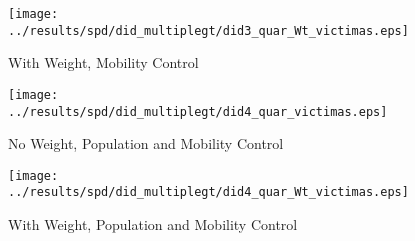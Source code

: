 \documentclass[11pt,letterpaper]{article}
\begin{document}
\begin{figure}[H]
\caption{With Weight, Mobility Control}
\centering
\texttt{[image: ../results/spd/did\_multiplegt/did3\_quar\_Wt\_victimas.eps]}
\end{figure}
\begin{figure}[H]
\caption{No Weight, Population and Mobility Control}
\centering
\texttt{[image: ../results/spd/did\_multiplegt/did4\_quar\_victimas.eps]}
\end{figure}

\begin{figure}[H]
\caption{With Weight, Population and Mobility Control}
\centering
\texttt{[image: ../results/spd/did\_multiplegt/did4\_quar\_Wt\_victimas.eps]}
\end{figure}
\end{document}
